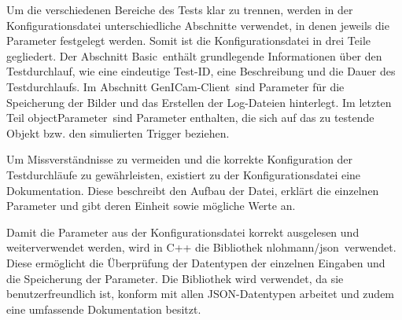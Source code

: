 \vspace{12pt}



Um die verschiedenen Bereiche des Tests klar zu trennen, werden in der Konfigurationsdatei unterschiedliche Abschnitte verwendet, in denen jeweils die Parameter festgelegt werden. 
Somit ist die Konfigurationsdatei in drei Teile gegliedert. Der Abschnitt \glqq Basic\grqq\ enthält grundlegende Informationen über den Testdurchlauf, wie eine eindeutige Test-ID, eine 
Beschreibung und die Dauer des Testdurchlaufs. Im Abschnitt \glqq GenICam-Client\grqq\ sind Parameter für die Speicherung der Bilder und das Erstellen der Log-Dateien hinterlegt. Im letzten 
Teil \glqq objectParameter\grqq\ sind Parameter enthalten, die sich auf das zu testende Objekt bzw. den simulierten Trigger beziehen.

Um Missverständnisse zu vermeiden und die korrekte Konfiguration der Testdurchläufe zu gewährleisten, existiert zu der Konfigurationsdatei eine Dokumentation. Diese beschreibt 
den Aufbau der Datei, erklärt die einzelnen Parameter und gibt deren Einheit sowie mögliche Werte an.

Damit die Parameter aus der Konfigurationsdatei korrekt ausgelesen und weiterverwendet werden, wird in C++ die Bibliothek \glqq nlohmann/json\grqq\ verwendet. Diese ermöglicht die 
Überprüfung der Datentypen der einzelnen Eingaben und die Speicherung der Parameter. Die Bibliothek wird verwendet, da sie benutzerfreundlich ist, konform mit allen JSON-Datentypen 
arbeitet und zudem eine umfassende Dokumentation besitzt.